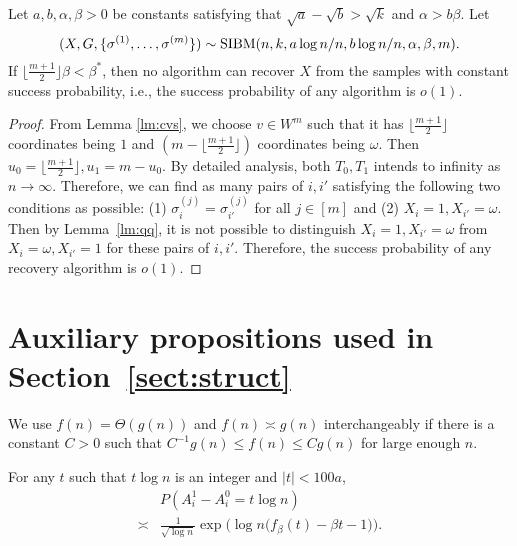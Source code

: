 \documentclass{article}
\begin{document}
\begin{proposition}
	Let $a,b,\alpha,\beta> 0$ be constants satisfying that $\sqrt{a}-\sqrt{b} > \sqrt{k}$ and $\alpha>b\beta$. 
	Let 
	$$
	(X,G,\{\sigma^{(1)},\dots,\sigma^{(m)}\})\sim \operatorname{SIBM}(n,k,a\log n/n, b\log n/n,\alpha,\beta, m) .
	$$
	If $\lfloor\frac{m+1}{2} \rfloor \beta<\beta^\ast$, then no algorithm can recover $X$ from the samples with constant success probability, i.e., the success probability of any algorithm is $o(1)$.
\end{proposition}
\begin{proof}
	From Lemma \ref{lm:cvs}, we choose $v \in W^m$ such that it has $\lfloor \frac{m+1}{2} \rfloor$ coordinates being $1$
	and $(m-\lfloor \frac{m+1}{2} \rfloor)$ coordinates being $\omega$.
	Then $u_0 = \lfloor \frac{m+1}{2} \rfloor, u_1 = m - u_0$.
	By detailed analysis, both $T_0, T_1$ intends to infinity as $n \to \infty$.
	Therefore, we can find as many pairs of $i, i'$ satisfying the following two conditions as possible: (1) $\sigma_{i}^{(j)}=\sigma_{i'}^{(j)}$ for all $j\in[m]$ and
	(2) $X_i = 1, X_{i'} = \omega$.
	Then by Lemma~\ref{lm:qq}, it is not possible to distinguish $X_i = 1, X_{i'} = \omega$ from $X_i = \omega, X_{i'} = 1$
	for these pairs of $i, i'$.
	Therefore, the success probability of any recovery algorithm is $o(1)$.
\end{proof}
\appendix

\section{Auxiliary propositions used in Section~\ref{sect:struct}}\label{ap:um}




We use $f(n)=\Theta(g(n))$ and $f(n)\asymp g(n)$ interchangeably if there is a constant $C>0$ such that $C^{-1}g(n)\le f(n)\le C g(n)$ for large enough $n$.

\begin{proposition}  \label{prop:99}
For any $t$ such that $t\log n$ is an integer and $|t|<100a$,
\begin{equation} \label{eq:ly}
\begin{aligned}
& P(A^1_i-A^0_i = t\log n)  \\
\asymp & \frac{1} {\sqrt{\log n}} \exp\Big(\log n
\Big(f_{\beta}(t) - \beta t -1 \Big)\Big) .
\end{aligned}
\end{equation}
\end{proposition}
\end{document}
